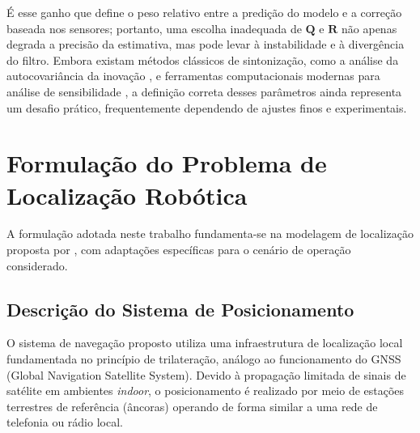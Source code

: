 \documentclass[journal]{IEEEtran}
\begin{document}
É esse ganho que define o peso relativo entre a predição do modelo e a correção baseada nos sensores; portanto, uma escolha inadequada de $\mathbf{Q}$ e $\mathbf{R}$ não apenas degrada a precisão da estimativa, mas pode levar à instabilidade e à divergência do filtro. Embora existam métodos clássicos de sintonização, como a análise da autocovariância da inovação \cite{Mehra1970}, e ferramentas computacionais modernas para análise de sensibilidade \cite{falek2020}, a definição correta desses parâmetros ainda representa um desafio prático, frequentemente dependendo de ajustes finos e experimentais.



\section{Formulação do Problema de Localização Robótica}
\label{sec:traject}

A formulação adotada neste trabalho fundamenta-se na modelagem de localização proposta por \cite{falek2020}, com adaptações específicas para o cenário de operação considerado.

\subsection{Descrição do Sistema de Posicionamento}

O sistema de navegação proposto utiliza uma infraestrutura de localização local fundamentada no princípio de trilateração, análogo ao funcionamento do GNSS (Global Navigation Satellite System). Devido à propagação limitada de sinais de satélite em ambientes \textit{indoor}, o posicionamento é realizado por meio de estações terrestres de referência (âncoras) operando de forma similar a uma rede de telefonia ou rádio local.
\end{document}
